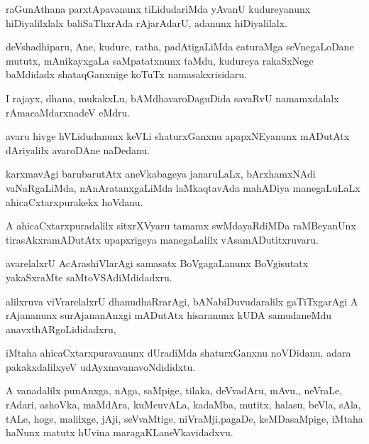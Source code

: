 \documentclass{article}
\begin{document}
\begin{mn}%
raGunAthana parxtApavanunx tiLidudariMda yAvanU kudureyanunx hiDiyalilxlalx baliSaThxrAda 
rAjarAdarU, adanunx hiDiyalilalx.
\end{mn}

\begin{mn}%
deVshadhiparu, Ane, kudure, ratha, padAtigaLiMda caturaMga seVnegaLoDane mututx, mAnikayxgaLa
saMpatatxnunx taMdu, kudureya rakaSxNege baMdidadx shataqGanxnige koTuTx namasakxrisidaru.
\end{mn}

\begin{mn}%
I rajayx, dhana, mukakxLu, bAMdhavaroDaguDida savaRvU namamxdalalx rAmacaMdarxnadeV eMdru.
\end{mn}

\begin{mn}%
avaru hivge  hVLidudanunx keVLi shaturxGanxnu apapxNEyanunx mADutAtx dAriyalilx avaroDAne 
naDedanu.
\end{mn}

\begin{mn}%
karxmavAgi barubarutAtx aneVkabageya janaruLaLx, bArxhamxNAdi vaNaRgaLiMda, 
nAnAratanxgaLiMda laMkaqtavAda mahADiya manegaLuLaLx ahicaCxtarxpurakekx hoVdanu.
\end{mn}

\begin{mn}%
A ahicaCxtarxpuradalilx sitxrXVyaru tamamx swMdayaRdiMDa raMBeyanUnx tirasAkxramADutAtx 
upapxrigeya manegaLalilx vAsamADutitxruvaru.
\end{mn}

\begin{mn}%
avarelalxrU AcArashiVlarAgi samasatx BoVgagaLanunx BoVgisutatx yakaSxraMte 
saMtoVSAdiMdidadxru.
\end{mn}

\begin{mn}%
alilxruva viVrarelalxrU dhanudhaRrarAgi, bANabiDuvudaralilx gaTiTxgarAgi A rAjananunx 
surAjananAnxgi mADutAtx hisaranunx kUDA samudaneMdu anavxthARgoLididadxru,
\end{mn}

\begin{mn}%
iMtaha ahicaCxtarxpuravanunx dUradiMda shaturxGanxnu noVDidanu. adara pakakxdalilxyeV 
udAyxnavanavoNdididxtu.
\end{mn}

\begin{mn}%
A vanadalilx punAnxga, nAga, saMpige, tilaka, deVvadAru, mAvu,, neVraLe, rAdari, ashoVka, 
maMdAra, kuMcuvALa, kadaMba, mutitx, halasu, beVla, sAla, tALe, hoge, malilxge, jAji, 
seVvaMtige, niVraMji,pagaDe, keMDasaMpige, iMtaha haNunx matutx hUvina 
maragaKLaneVkavidadxvu.
\end{mn}
\end{document}
